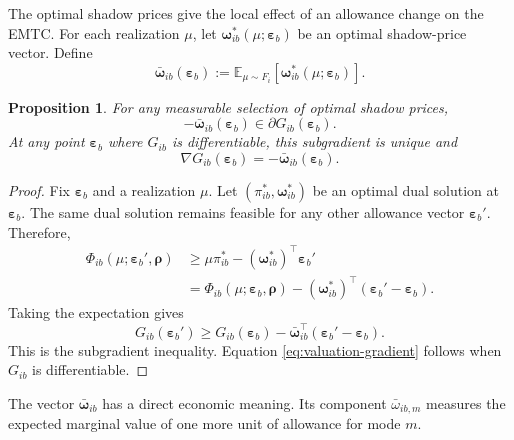 \documentclass{article}
\newtheorem{proposition}{Proposition}
\begin{document}
The optimal shadow prices give the local effect of an allowance change
on the EMTC. For each realization $\mu$, let
$\bm\omega_{ib}^*(\mu;\bm\varepsilon_b)$ be an optimal shadow-price
vector. Define
\begin{equation}
    \bar{\bm\omega}_{ib}(\bm\varepsilon_b)
    :=
    \mathbb E_{\mu\sim F_i}
    \left[
        \bm\omega_{ib}^*(\mu;\bm\varepsilon_b)
    \right].
    \label{eq:expected-shadow-price}
\end{equation}

\begin{proposition}
For any measurable selection of optimal shadow prices,
\begin{equation}
    -
    \bar{\bm\omega}_{ib}(\bm\varepsilon_b)
    \in
    \partial G_{ib}(\bm\varepsilon_b).
    \label{eq:valuation-subgradient}
\end{equation}
At any point $\bm\varepsilon_b$ where $G_{ib}$ is differentiable, this
subgradient is unique and
\begin{equation}
    \nabla G_{ib}(\bm\varepsilon_b)
    =
    -
    \bar{\bm\omega}_{ib}(\bm\varepsilon_b).
    \label{eq:valuation-gradient}
\end{equation}
\label{prop:expected-shadow-price}
\end{proposition}

\begin{proof}
Fix $\bm\varepsilon_b$ and a realization $\mu$. Let
$(\pi_{ib}^*,\bm\omega_{ib}^*)$ be an optimal dual solution at
$\bm\varepsilon_b$. The same dual solution remains feasible for any
other allowance vector $\bm\varepsilon_b'$. Therefore,
\begin{align}
    \Phi_{ib}(\mu;\bm\varepsilon_b',\bm\rho)
    &\geq
    \mu\pi_{ib}^*
    -
    (\bm\omega_{ib}^*)^{\top}\bm\varepsilon_b'
    \\
    &=
    \Phi_{ib}(\mu;\bm\varepsilon_b,\bm\rho)
    -
    (\bm\omega_{ib}^*)^{\top}
    (\bm\varepsilon_b'-\bm\varepsilon_b).
\end{align}
Taking the expectation gives
\begin{equation}
    G_{ib}(\bm\varepsilon_b')
    \geq
    G_{ib}(\bm\varepsilon_b)
    -
    \bar{\bm\omega}_{ib}^{\top}
    (\bm\varepsilon_b'-\bm\varepsilon_b).
\end{equation}
This is the subgradient inequality. Equation
\eqref{eq:valuation-gradient} follows when $G_{ib}$ is differentiable.
\end{proof}

The vector $\bar{\bm\omega}_{ib}$ has a direct economic meaning. Its
component $\bar\omega_{ib,m}$ measures the expected marginal value of
one more unit of allowance for mode $m$. 
\end{document}

